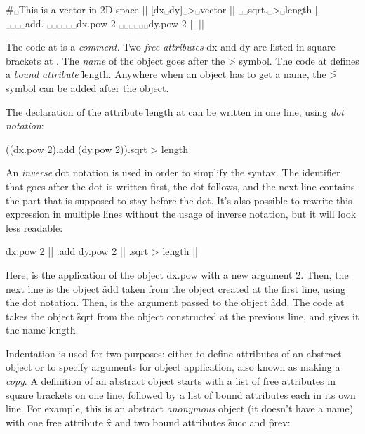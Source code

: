\begin{eocode}
#␣This is a vector in 2D space |$\label{ln:comment}$|
[dx␣dy]␣>␣vector |$\label{ln:vector}$|
␣␣sqrt.␣>␣length |$\label{ln:length}$|
␣␣␣␣add.
␣␣␣␣␣␣dx.pow 2
␣␣␣␣␣␣dy.pow 2 |$\label{ln:length-end}$| |$\label{ln:vector-end}$|
\end{eocode}

The code at  is a \emph{comment}.
Two \emph{free attributes} \f{dx} and \f{dy}
are listed in square brackets at .
The \emph{name} of the object goes after the \f{>} symbol.
The code at  defines
a \emph{bound attribute} \f{length}. Anywhere when an object
has to get a name, the \f{>} symbol can be added after the object.

The declaration of the attribute \f{length} at 
can be written in one line, using \emph{dot notation}:

\begin{eocode}
((dx.pow 2).add (dy.pow 2)).sqrt > length
\end{eocode}

An \emph{inverse} dot notation is used in order to simplify
the syntax. The identifier that goes after the dot is written
first, the dot follows, and the next line contains the part
that is supposed to stay before the dot. It's also possible to rewrite
this expression in multiple lines without the usage of
inverse notation, but it will look less readable:

\begin{eocode}
dx.pow 2 |$\label{ln:dx-pow}$|
.add
  dy.pow 2 |$\label{ln:dx-pow-2}$|
.sqrt > length |$\label{ln:dx-pow-3}$|
\end{eocode}

Here,  is the application of the object \f{dx.pow} with
a new argument \f{2}. Then, the next line is the object \f{add} taken
from the object created at the first line, using the dot notation. Then,
 is the argument passed to the object \f{add}.
The code at  takes the object \f{sqrt} from the object constructed
at the previous line, and gives it the name \f{length}.

Indentation is used for two purposes: either to define attributes
of an abstract object or to specify arguments for object application, also
known as making a \emph{copy}.
A definition of an abstract object starts with a list of free attributes
in square brackets on one line, followed by a list of bound attributes
each in its own line. For example, this is an abstract \emph{anonymous} object
(it doesn't have a name)
with one free attribute \f{x} and two bound attributes \f{succ} and \f{prev}:

